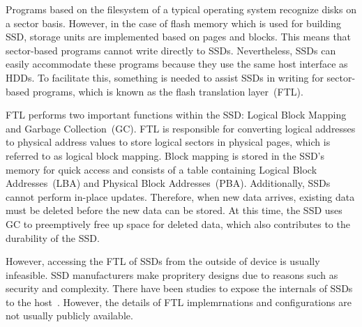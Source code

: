 \begin{comment}
Programs based on the filesystem of a typical operating system recognize disks on a sector basis.
However, in the case of SSDs, storage units are implemented based on pages and blocks.
This means that sector-based programs cannot write directly to SSDs.
Nevertheless, SSDs can easily accommodate these programs because they use the same host interface as HDDs.
To facilitate this, something is needed to assist SSDs in writing for sector-based programs, which is known as the Flash Translation Layer (FTL).

FTL performs two important functions within the SSD: Logical Block Mapping and Garbage Collection (GC).
FTL is responsible for converting logical addresses to physical address values to store logical sectors in physical pages, which is referred to as logical block mapping.
Block mapping is stored in the SSD's memory for quick access and consists of a table containing Logical Block Addresses (LBA) and Physical Block Addresses (PBA).
Additionally, SSDs cannot perform in-place updates.
Therefore, when new data arrives, existing data must be deleted before the new data can be stored.
At this time, the SSD uses GC to preemptively free up space for deleted data, which also contributes to the durability of the SSD.

In this study, we copy and store information from the SSD.
However, accessing the SSD's FTL from the outside is not feasible due to reasons such as security and complexity.
\end{comment}

Programs based on the filesystem of a typical operating system recognize disks on a sector basis.
However, in the case of flash memory which is used for building SSD, storage units are implemented based on pages and blocks.
This means that sector-based programs cannot write directly to SSDs.
Nevertheless, SSDs can easily accommodate these programs because they use the same host interface as HDDs.
To facilitate this, something is needed to assist SSDs in writing for sector-based programs, which is known as the flash translation layer~(FTL).

FTL performs two important functions within the SSD: Logical Block Mapping and Garbage Collection~(GC).
FTL is responsible for converting logical addresses to physical address values to store logical sectors in physical pages, which is referred to as logical block mapping.
Block mapping is stored in the SSD's memory for quick access and consists of a table containing Logical Block Addresses~(LBA) and Physical Block Addresses~(PBA).
Additionally, SSDs cannot perform in-place updates.
Therefore, when new data arrives, existing data must be deleted before the new data can be stored.
At this time, the SSD uses GC to preemptively free up space for deleted data, which also contributes to the durability of the SSD.

However, accessing the FTL of SSDs from the outside of device is usually infeasible.
SSD manufacturers make propritery designs due to reasons such as security and complexity.
There have been studies to expose the internals of SSDs to the host~\cite{ocssd,zns,fdp}.
However, the details of FTL implemrnations and configurations are not usually publicly available.
